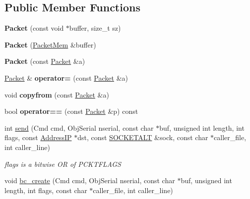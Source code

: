 \subsection*{Public Member Functions}
\begin{DoxyCompactItemize}
\item 
{\bfseries Packet} (const void $\ast$buffer, size\+\_\+t sz)\hypertarget{classPacket_a9f6f8c9a41852789465856d80c0ea1cc}{}\label{classPacket_a9f6f8c9a41852789465856d80c0ea1cc}

\item 
{\bfseries Packet} (\hyperlink{classPacketMem}{Packet\+Mem} \&buffer)\hypertarget{classPacket_a6b08ac749e334d7a24a564893e4b3178}{}\label{classPacket_a6b08ac749e334d7a24a564893e4b3178}

\item 
{\bfseries Packet} (const \hyperlink{classPacket}{Packet} \&a)\hypertarget{classPacket_a9e872c4ed10360f95f8fcb207a4d489b}{}\label{classPacket_a9e872c4ed10360f95f8fcb207a4d489b}

\item 
\hyperlink{classPacket}{Packet} \& {\bfseries operator=} (const \hyperlink{classPacket}{Packet} \&a)\hypertarget{classPacket_aff48623b5c0e77344950cf3be94cacdb}{}\label{classPacket_aff48623b5c0e77344950cf3be94cacdb}

\item 
void {\bfseries copyfrom} (const \hyperlink{classPacket}{Packet} \&a)\hypertarget{classPacket_aa20fc46a950c7f140833bd68b81e894d}{}\label{classPacket_aa20fc46a950c7f140833bd68b81e894d}

\item 
bool {\bfseries operator==} (const \hyperlink{classPacket}{Packet} \&p) const \hypertarget{classPacket_ae114a312ed97d8b672e87df9edd95f3d}{}\label{classPacket_ae114a312ed97d8b672e87df9edd95f3d}

\item 
int \hyperlink{classPacket_af36b619bcf2157f0d5e7d6401ae898c6}{send} (Cmd cmd, Obj\+Serial nserial, const char $\ast$buf, unsigned int length, int flags, const \hyperlink{structAddressIP}{Address\+IP} $\ast$dst, const \hyperlink{classSOCKETALT}{S\+O\+C\+K\+E\+T\+A\+LT} \&sock, const char $\ast$caller\+\_\+file, int caller\+\_\+line)\hypertarget{classPacket_af36b619bcf2157f0d5e7d6401ae898c6}{}\label{classPacket_af36b619bcf2157f0d5e7d6401ae898c6}

\begin{DoxyCompactList}\small\item\em flags is a bitwise OR of P\+C\+K\+T\+F\+L\+A\+GS \end{DoxyCompactList}\item 
void \hyperlink{classPacket_a1379beadfc6affe47a3d481ca58ba77b}{bc\+\_\+create} (Cmd cmd, Obj\+Serial nserial, const char $\ast$buf, unsigned int length, int flags, const char $\ast$caller\+\_\+file, int caller\+\_\+line)\hypertarget{classPacket_a1379beadfc6affe47a3d481ca58ba77b}{}\label{classPacket_a1379beadfc6affe47a3d481ca58ba77b}


\end{DoxyCompactItemize}
